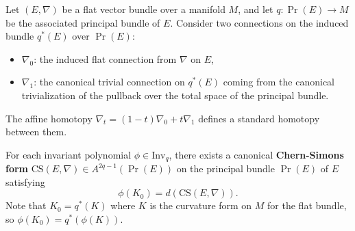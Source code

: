 Let $(E, \nabla)$ be a flat vector bundle over a manifold $M$, and let $q: \Pr(E) \to M$ be the associated principal bundle of $E$. Consider two connections on the induced bundle $q^*(E)$ over $\Pr(E)$:
\begin{itemize}
\item $\nabla_0$: the induced flat connection from $\nabla$ on $E$,
\item $\nabla_1$: the canonical trivial connection on $q^*(E)$ coming from the canonical trivialization of the pullback over the total space of the principal bundle.
\end{itemize}
The affine homotopy $\nabla_t = (1-t)\nabla_0 + t\nabla_1$ defines a standard homotopy between them.

For each invariant polynomial $\phi \in \text{Inv}_q$, there exists a canonical \textbf{Chern-Simons form} $\text{CS}(E, \nabla) \in A^{2q-1}(\Pr(E))$ on the principal bundle $\Pr(E)$ of $E$ satisfying
$$
\phi(K_0) = d(\text{CS}(E, \nabla)).
$$
Note that $K_0 = q^*(K)$ where $K$ is the curvature form on $M$ for the flat bundle, so $\phi(K_0) = q^*(\phi(K))$.
